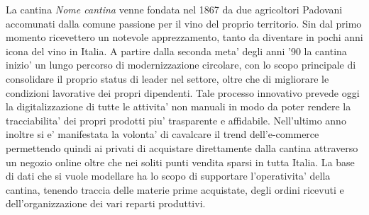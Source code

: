 La cantina \emph{Nome cantina} venne fondata nel 1867 da due agricoltori Padovani accomunati dalla comune passione per il vino del proprio territorio. Sin dal primo momento ricevettero un notevole apprezzamento, tanto da diventare in pochi anni icona del vino in Italia. A partire dalla seconda meta' degli anni '90 la cantina inizio' un lungo percorso di modernizzazione circolare, con lo scopo principale di consolidare il proprio status di leader nel settore, oltre che di migliorare le condizioni lavorative dei propri dipendenti. Tale processo innovativo prevede oggi la digitalizzazione di tutte le attivita' non manuali in modo da poter rendere la tracciabilita' dei propri prodotti piu' trasparente e affidabile. Nell'ultimo anno inoltre si e' manifestata la volonta' di cavalcare il trend dell'e-commerce permettendo quindi ai privati di acquistare direttamente dalla cantina attraverso un negozio online oltre che nei soliti punti vendita sparsi in tutta Italia. La base di dati che si vuole modellare ha lo scopo di supportare l'operativita' della cantina, tenendo traccia delle materie prime acquistate, degli ordini ricevuti e dell'organizzazione dei vari reparti produttivi.